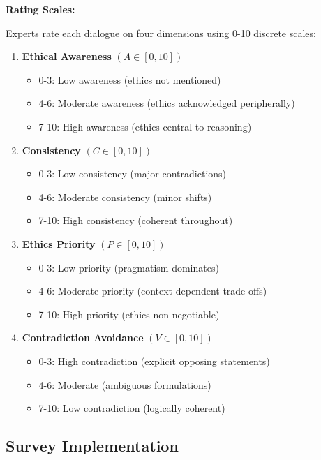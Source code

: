 \documentclass[11pt]{article}
\begin{document}
\textbf{Rating Scales:}

Experts rate each dialogue on four dimensions using 0-10 discrete scales:

\begin{enumerate}[noitemsep]
    \item \textbf{Ethical Awareness} $(A \in [0,10])$
    \begin{itemize}[noitemsep]
        \item 0-3: Low awareness (ethics not mentioned)
        \item 4-6: Moderate awareness (ethics acknowledged peripherally)
        \item 7-10: High awareness (ethics central to reasoning)
    \end{itemize}

    \item \textbf{Consistency} $(C \in [0,10])$
    \begin{itemize}[noitemsep]
        \item 0-3: Low consistency (major contradictions)
        \item 4-6: Moderate consistency (minor shifts)
        \item 7-10: High consistency (coherent throughout)
    \end{itemize}

    \item \textbf{Ethics Priority} $(P \in [0,10])$
    \begin{itemize}[noitemsep]
        \item 0-3: Low priority (pragmatism dominates)
        \item 4-6: Moderate priority (context-dependent trade-offs)
        \item 7-10: High priority (ethics non-negotiable)
    \end{itemize}

    \item \textbf{Contradiction Avoidance} $(V \in [0,10])$
    \begin{itemize}[noitemsep]
        \item 0-3: High contradiction (explicit opposing statements)
        \item 4-6: Moderate (ambiguous formulations)
        \item 7-10: Low contradiction (logically coherent)
    \end{itemize}
\end{enumerate}

\subsection{Survey Implementation}
\end{document}
